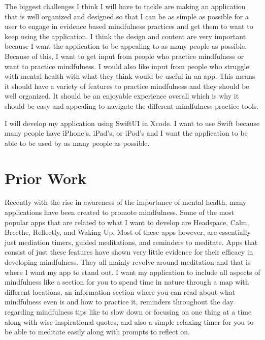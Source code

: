 \documentclass[12pt,twocolumn]{article}
\begin{document}
The biggest challenges I think I will have to tackle are making an application that is well organized and designed so that I can be as simple as possible for a user to engage in evidence based mindfulness practices and get them to want to keep using the application. I think the design and content are very important because I want the application to be appealing to as many people as possible. Because of this, I want to get input from people who practice mindfulness or want to practice mindfulness. I would also like input from people who struggle with mental health with what they think would be useful in an app. This means it should have a variety of features to practice mindfulness and they should be well organized. It should be an enjoyable experience overall which is why it should be easy and appealing to navigate the different mindfulness practice tools.


I will develop my application using SwiftUI in Xcode. I want to use Swift because many people have iPhone's, iPad's, or iPod's and I want the application to be able to be used by as many people as possible.

\section{Prior Work}



Recently with the rise in awareness of the importance of mental health, many applications have been created to promote mindfulness. Some of the most popular apps that are related to what I want to develop are Headspace, Calm, Breethe, Reflectly, and Waking Up. Most of these apps however, are essentially just mediation timers, guided meditations, and reminders to meditate. Apps that consist of just these features have shown very little evidence for their efficacy in developing mindfulness. They all mainly revolve around meditation and that is where I want my app to stand out. I want my application to include all aspects of mindfulness like a section for you to spend time in nature through a map with different locations, an information section where you can read about what mindfulness even is and how to practice it, reminders throughout the day regarding mindfulness tips like to slow down or focusing on one thing at a time along with wise inspirational quotes, and also a simple relaxing timer for you to be able to meditate easily along with prompts to reflect on. 
\end{document}
